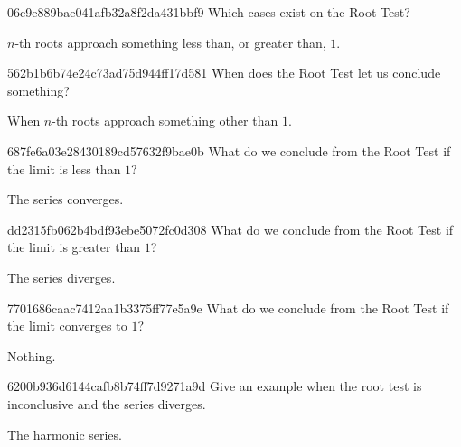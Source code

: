 \begin{note}{06c9e889bae041afb32a8f2da431bbf9}
    Which cases exist on the Root Test?

    \begin{cloze}{1}
        \({ n }\)-th roots approach something less than, or greater than, \({ 1 }\).
    \end{cloze}
\end{note}

\begin{note}{562b1b6b74e24c73ad75d944ff17d581}
    When does the Root Test let us conclude something?

    \begin{cloze}{1}
        When \({ n }\)-th roots approach something other than \({ 1 }\).
    \end{cloze}
\end{note}

\begin{note}{687fe6a03e28430189cd57632f9bae0b}
    What do we conclude from the Root Test if the limit is less than \({ 1 }\)?

    \begin{cloze}{1}
        The series converges.
    \end{cloze}
\end{note}

\begin{note}{dd2315fb062b4bdf93ebe5072fc0d308}
    What do we conclude from the Root Test if the limit is greater than \({ 1 }\)?

    \begin{cloze}{1}
        The series diverges.
    \end{cloze}
\end{note}

\begin{note}{7701686caac7412aa1b3375ff77e5a9e}
    What do we conclude from the Root Test if the limit converges to \({ 1 }\)?

    \begin{cloze}{1}
        Nothing.
    \end{cloze}
\end{note}

\begin{note}{6200b936d6144cafb8b74ff7d9271a9d}
    Give an example when the root test is inconclusive and the series diverges.

    \begin{cloze}{1}
        The harmonic series.
    \end{cloze}
\end{note}

